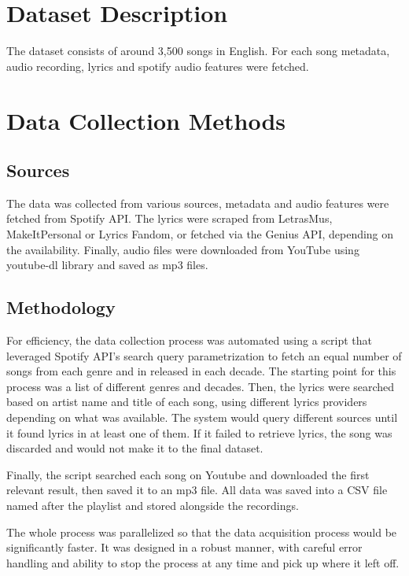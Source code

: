 \section{Dataset Description}
\label{sec:datasetdescription}

The dataset consists of around 3,500 songs in English. For each song metadata, audio
recording, lyrics and spotify audio features were fetched.

\section{Data Collection Methods}
\label{sec:datacollectionmethods}

\subsection{Sources}
The data was collected from various sources, metadata and audio features were
fetched from Spotify API. The lyrics were scraped from LetrasMus,
MakeItPersonal or Lyrics Fandom, or fetched via the Genius API, depending on
the availability. Finally, audio files were downloaded from YouTube using
youtube-dl library and saved as mp3
files. \cite{spotify_api,makeitpersonal,genius,letras_mus,lyricsfandom,ytdl} 

\subsection{Methodology}
For efficiency, the data collection process was automated using a script that
leveraged Spotify API’s search query parametrization to fetch an equal number
of songs from each genre and in released in each decade. The starting point for
this process was a list of different genres and decades. Then, the lyrics were
searched based on artist name and title of each song, using different lyrics
providers depending on what was available. The system would query different
sources until it found lyrics in at least one of them. If it failed to retrieve
lyrics, the song was discarded and would not make it to the final dataset.


Finally, the script searched each song on Youtube  and downloaded the first
relevant result, then saved it to an mp3 file. All data was saved into a CSV
file named after the playlist and stored alongside the recordings. 

The whole process was parallelized so that the data acquisition process would
be significantly faster. It was designed in a robust manner, with careful error
handling and ability to stop the process at any time and pick up where it left
off.


